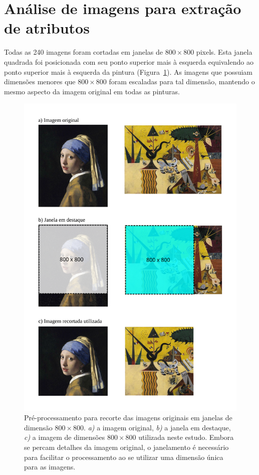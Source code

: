 \section{Análise de imagens para extração de atributos}

Todas as 240 imagens foram cortadas em janelas de $800\times800$
pixels. Esta janela quadrada foi posicionada com seu ponto superior
mais à esquerda equivalendo ao ponto superior mais à esquerda da
pintura (Figura~\ref{fig:janelamento}). As imagens que possuiam
dimensões menores que $800\times800$ foram escaladas para tal
dimensão, mantendo o mesmo aspecto da imagem original em todas as
pinturas.

\begin{figure}[ht!]
\begin{center}
        \includegraphics{figs/passos_janelamento}
      \caption{Pré-processamento para recorte das imagens originais em
        janelas de dimensão $800\times800$. \textit{a)} a imagem
        original, \textit{b)} a janela em destaque, \textit{c)} a
        imagem de dimensões $800\times800$ utilizada neste
        estudo. Embora se percam detalhes da imagem original, o
        janelamento é necessário para facilitar o processamento ao se
        utilizar uma dimensão única para as imagens.}
        \label{fig:janelamento}
\end{center}
\end{figure}

